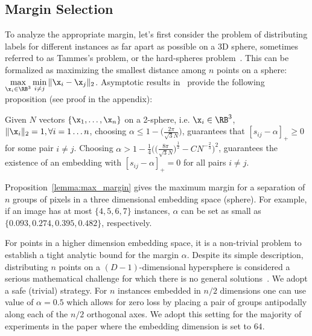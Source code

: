 \subsection{Margin Selection}
To analyze the appropriate margin, let's first consider the problem of
distributing labels for different instances as far apart as possible on a 3D
sphere, sometimes referred to as Tammes's problem, or the hard-spheres
problem~\cite{saff1997distributing}. This can be formalized as maximizing
the smallest distance among $n$ points on a sphere: $\max\limits_{\x_i\in
\RB^3} \min\limits_{i\not=j}\Vert \x_i-\x_j\Vert_2$.  Asymptotic results
in~\cite{habicht1951lagerung} provide the following proposition (see proof in the
appendix):
\begin{propositions}
\label{lemma:max_margin}
Given $N$ vectors $\{\x_1, \dots, \x_n\}$ on a 2-sphere, i.e. $\x_i \in \RB^3$,
$\Vert\x_i\Vert_2 = 1, \forall i=1\dots n$, choosing $\alpha \leq 1- \Big(
\frac{2\pi}{\sqrt{3}N} \Big)$, guarantees that $[s_{ij}-\alpha]_{+}\geq 0$ for
some pair $i \not= j$. Choosing $\alpha > 1- \frac{1}{4} \Bigg(
\Big(\frac{8\pi}{\sqrt{3}N}\Big)^{\frac{1}{2}} -CN^{-\frac{2}{3}}\Bigg)^2$,
guarantees the existence of an embedding with $[s_{ij}-\alpha]_{+}=0$ for all
pairs $i \not= j$.
\end{propositions}
Proposition~\ref{lemma:max_margin} gives the maximum margin for a separation of $n$
groups of pixels in a three dimensional embedding space (sphere).  For example,
if an image has at most $\{4,5,6,7\}$ instances, $\alpha$ can be set as small
as $\{0.093, 0.274, 0.395, 0.482\}$, respectively.

For points in a higher dimension embedding space, it is a non-trivial problem to
establish a tight analytic bound for the margin $\alpha$. Despite its simple
description, distributing $n$ points on a $(D-1)$-dimensional hypersphere is
considered a serious mathematical challenge for which there is no general
solutions~\cite{saff1997distributing, lovisolo2001uniform}. We adopt a safe
(trivial) strategy. For $n$ instances embedded in $n/2$ dimensions one can use
value of $\alpha=0.5$ which allows for zero loss by placing a pair of groups
antipodally along each of the $n/2$ orthogonal axes. We adopt this setting for
the majority of experiments in the paper where the embedding dimension is set
to $64$.

